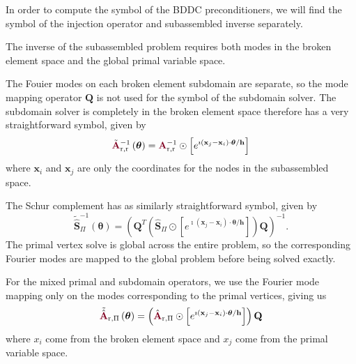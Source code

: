In order to compute the symbol of the BDDC preconditioners, we will find the symbol of the injection operator and subassembled inverse separately.

The inverse of the subassembled problem requires both modes in the broken element space and the global primal variable space.

The Fouier modes on each broken element subdomain are separate, so the mode mapping operator $\mathbf{Q}$ is not used for the symbol of the subdomain solver.
The subdomain solver is completely in the broken element space therefore has a very straightforward symbol, given by
\begin{equation}
\tilde{\color{burgundy}\mathbf{A}}_{\text{r}, \text{r}}^{-1} \left( \boldsymbol{\theta} \right) = {\color{burgundy}\mathbf{A}}_{\text{r}, \text{r}}^{-1} \odot \left[ e^{\imath \left( \mathbf{x}_j - \mathbf{x}_i \right) \cdot \boldsymbol{\theta} / \mathbf{h}} \right]
\end{equation}
where $\mathbf{x}_i$ and $\mathbf{x}_j$ are only the coordinates for the nodes in the subassembled space.

The Schur complement has as similarly straightforward symbol, given by
\begin{equation}
\tilde{\hat{\mathbf{S}}}_{\Pi}^{-1} \left( \boldsymbol{\theta} \right) = \left( \mathbf{Q}^T \left( \hat{\mathbf{S}}_{\Pi} \odot \left[ e^{\imath \left( \mathbf{x}_j - \mathbf{x}_i \right) \cdot \boldsymbol{\theta} / \mathbf{h}} \right] \right) \mathbf{Q} \right)^{-1}.
\end{equation}
The primal vertex solve is global across the entire problem, so the corresponding Fourier modes are mapped to the global problem before being solved exactly.

For the mixed primal and subdomain operators, we use the Fourier mode mapping only on the modes corresponding to the primal vertices, giving us
\begin{equation}
\tilde{\hat{\color{burgundy}\mathbf{A}}}\color{black}_{\text{r}, \Pi} \left( \boldsymbol{\theta} \right) = \left( \hat{\color{burgundy}\mathbf{A}}_{\text{r}, \Pi} \odot \left[ e^{\imath \left( \mathbf{x}_j - \mathbf{x}_i \right) \cdot \boldsymbol{\theta} / \mathbf{h}} \right] \right) \mathbf{Q}
\end{equation}
where $x_i$ come from the broken element space and $x_j$ come from the primal variable space.


